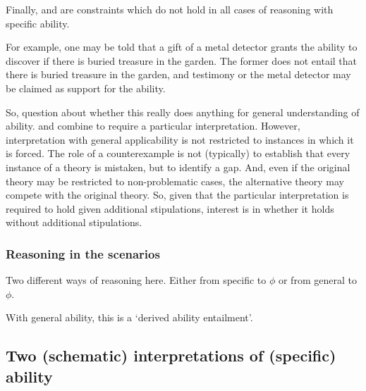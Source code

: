 \begin{note}
  Finally, \gsi{} and  are constraints which do not hold in all cases of reasoning with specific ability.

  For example, one may be told that a gift of a metal detector grants the ability to discover if there is buried treasure in the garden.
  The former does not entail that there is buried treasure in the garden, and testimony or the metal detector may be claimed as support for the ability.

  So, question about whether this really does anything for general understanding of ability.
  \gsi{} and  combine to require a particular interpretation.
  However, interpretation with general applicability is not restricted to instances in which it is forced.
  The role of a counterexample is not (typically) to establish that every instance of a theory is mistaken, but to identify a gap.
  And, even if the original theory may be restricted to non-problematic cases, the alternative theory may compete with the original theory.
  So, given that the particular interpretation is required to hold given additional stipulations, interest is in whether it holds without additional stipulations.
\end{note}

\subsubsection{Reasoning in the scenarios}
\label{sec:reasoning-scenarios}

\begin{note}
  {
    \color{red}
    Two different ways of reasoning here.
    Either from specific to \(\phi\) or from general to \(\phi\).
  }
\end{note}

\begin{note}
  With general ability, this is a `derived ability entailment'.
\end{note}

\subsection{Two (schematic) interpretations of (specific) ability}
\label{sec:wr-ar}

